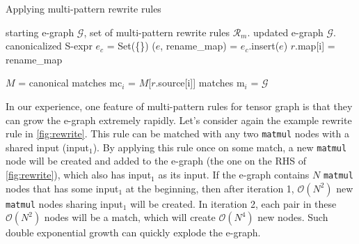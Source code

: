 \begin{algorithm}[t]
\small
\caption{Applying multi-pattern rewrite rules}
\label{alg:multi}
\begin{algorithmic}[1]
\Require starting e-graph $\mathcal{G}$, set of multi-pattern rewrite rules $\mathcal{R}_m$.
\Ensure updated e-graph $\mathcal{G}$.
\State canonicalized S-expr $e_c$ = Set(\{\})
 
    \State ($e$, rename\_map) = 
    \State $e_c$.insert($e$)
    \State $r$.map[i] = rename\_map
\EndFor
\EndFor

    \State $M$ =  
        \State canonical matches mc$_i$ = $M$[$r$.source[i]]
        \State matches m$_i$ = 
        \EndFor
            \State {}
            \EndIf
        \EndFor
    \EndFor
  \EndFor
\State \Return $\mathcal{G}$
\end{algorithmic}
\end{algorithm}

\iffalse
\CUT{
Multi-pattern rewrite rules have some important features that require special attention.
The first one is that they can grow the e-graph infinitely.
Let's consider again the example rewrite rule in \autoref{fig:rewrite}.
This rule can be matched with any two \texttt{matmul} nodes with a shared input (input$_1$).
By applying this rule once on some match, a new \texttt{matmul} node will be created and added to the e-graph (the one on the RHS of \autoref{fig:rewrite}), which also has input$_1$ as its input.
This new \texttt{matmul} node together with any of the original \texttt{matmul} node will become a new match for this rule.
This way, the example rule can be applied infinitely to grow the e-graph.
}
\fi

In our experience, one feature of multi-pattern rules for tensor graph is that they can grow the e-graph extremely rapidly.
Let's consider again the example rewrite rule in \autoref{fig:rewrite}.
This rule can be matched with any two \texttt{matmul} nodes with a shared input (input$_1$).
By applying this rule once on some match, a new \texttt{matmul} node will be created and added to the e-graph (the one on the RHS of \autoref{fig:rewrite}), which also has input$_1$ as its input.
If the e-graph contains $N$ \texttt{matmul} nodes that has some input$_1$ at the beginning, then after iteration 1, $\mathcal{O}(N^2)$ new \texttt{matmul} nodes sharing input$_1$ will be created.
In iteration 2, each pair in these $\mathcal{O}(N^2)$ nodes will be a match, which will create $\mathcal{O}(N^4)$ new nodes.
Such double exponential growth can quickly explode the e-graph.

